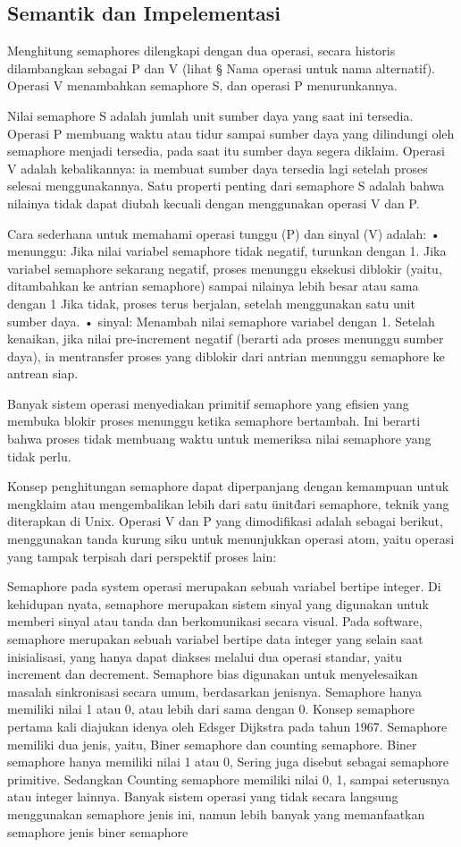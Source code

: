 \subsection{Semantik dan Impelementasi}
Menghitung semaphores dilengkapi dengan dua operasi, secara historis dilambangkan sebagai P dan V (lihat § Nama operasi untuk nama alternatif). Operasi V 
menambahkan semaphore S, dan operasi P menurunkannya.

Nilai semaphore S adalah jumlah unit sumber daya yang saat ini tersedia. Operasi P membuang waktu atau tidur sampai sumber daya yang dilindungi oleh semaphore 
menjadi tersedia, pada saat itu sumber daya segera diklaim. Operasi V adalah kebalikannya: ia membuat sumber daya tersedia lagi setelah proses selesai 
menggunakannya. Satu properti penting dari semaphore S adalah bahwa nilainya tidak dapat diubah kecuali dengan menggunakan operasi V dan P.

Cara sederhana untuk memahami operasi tunggu (P) dan sinyal (V) adalah:
• menunggu: Jika nilai variabel semaphore tidak negatif, turunkan dengan 1. Jika variabel semaphore sekarang negatif, proses menunggu eksekusi diblokir 
(yaitu, ditambahkan ke antrian semaphore) sampai nilainya lebih besar atau sama dengan 1 Jika tidak, proses terus berjalan, setelah menggunakan satu unit 
sumber daya.
• sinyal: Menambah nilai semaphore variabel dengan 1. Setelah kenaikan, jika nilai pre-increment negatif (berarti ada proses menunggu sumber daya), ia 
mentransfer proses yang diblokir dari antrian menunggu semaphore ke antrean siap.

Banyak sistem operasi menyediakan primitif semaphore yang efisien yang membuka blokir proses menunggu ketika semaphore bertambah. Ini berarti bahwa proses 
tidak membuang waktu untuk memeriksa nilai semaphore yang tidak perlu.

Konsep penghitungan semaphore dapat diperpanjang dengan kemampuan untuk mengklaim atau mengembalikan lebih dari satu \"unit\" dari semaphore, teknik yang 
diterapkan di Unix. Operasi V dan P yang dimodifikasi adalah sebagai berikut, menggunakan tanda kurung siku untuk menunjukkan operasi atom, yaitu operasi 
yang tampak terpisah dari perspektif proses lain:

Semaphore pada system operasi merupakan sebuah variabel bertipe integer. Di kehidupan nyata, semaphore merupakan sistem sinyal 		yang digunakan untuk memberi sinyal atau tanda dan berkomunikasi secara visual. Pada software, semaphore merupakan sebuah variabel bertipe data integer yang selain saat inisialisasi, yang hanya dapat diakses melalui dua operasi standar, yaitu increment dan decrement.
Semaphore bias digunakan untuk menyelesaikan masalah sinkronisasi secara umum, berdasarkan jenisnya. Semaphore hanya memiliki nilai 1 atau 0, atau lebih dari sama dengan 0. Konsep semaphore pertama kali diajukan idenya oleh Edsger Dijkstra pada tahun 1967. Semaphore memiliki dua jenis, yaitu, Biner semaphore dan counting semaphore. Biner semaphore hanya memiliki nilai 1 atau 0, Sering juga disebut sebagai semaphore primitive. Sedangkan Counting semaphore memiliki nilai 0, 1, sampai seterusnya atau integer lainnya. Banyak sistem operasi yang tidak secara langsung menggunakan semaphore jenis ini, namun lebih banyak yang memanfaatkan semaphore jenis biner semaphore

